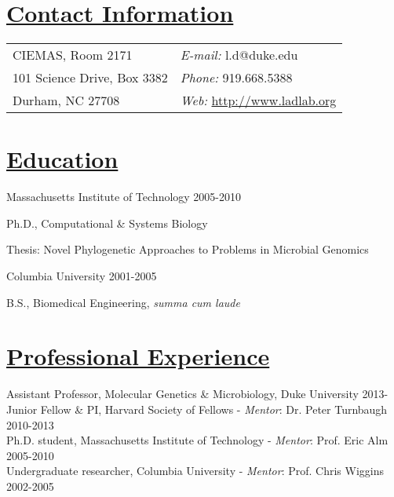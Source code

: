 \documentclass[overlapped,line,11pt]{res}
\newenvironment{list1}{
  \begin{list}{\ding{113}}{%
      \setlength{\itemsep}{0in}
      \setlength{\parsep}{0in} \setlength{\parskip}{0in}
      \setlength{\topsep}{0in} \setlength{\partopsep}{0in} 
      \setlength{\leftmargin}{0.17in}}}{\end{list}}
\begin{document}
\setlength{\pdfpageheight}{\paperheight}
\setlength{\pdfpagewidth}{\paperwidth}


\begin{resume}
\section{\underline{\sc Contact Information}}
\vspace{.05in}
\begin{tabular}{@{}p{4in}p{4in}}

CIEMAS, Room 2171     & {\it E-mail:}    l.d@duke.edu \\                
101 Science Drive, Box 3382   & {\it Phone:} 919.668.5388 \\
Durham, NC 27708 & {\it Web:} \url{http://www.ladlab.org} 

\end{tabular}

\section{\underline{\sc Education}}
\vspace{.05in}
Massachusetts Institute of Technology
\hfill 2005-2010\\

\vspace*{-5mm}
\begin{list1}
\item[] Ph.D., Computational \& Systems Biology
\item[] Thesis: Novel Phylogenetic Approaches to Problems in Microbial Genomics
\end{list1}

\vspace*{-2.5mm}
Columbia University \hfill 2001-2005\\
\vspace*{-5mm}
\begin{list1}
\item[] B.S., Biomedical Engineering, \emph{summa cum laude}
\end{list1}

\section{\underline{\sc Professional Experience}}
\vspace{.05in}
Assistant Professor, Molecular Genetics \& Microbiology, Duke
University \hfill 2013-\hspace{7.5mm} \\
Junior Fellow \& PI, Harvard Society of Fellows - \emph{Mentor}: Dr. Peter Turnbaugh \hfill 2010-2013\\
Ph.D. student, Massachusetts Institute of Technology - \emph{Mentor}: Prof. Eric Alm \hfill
2005-2010 \\
Undergraduate researcher, Columbia University - \emph{Mentor}: Prof. Chris Wiggins
\hfill 2002-2005 


\end{resume}
\end{document}
